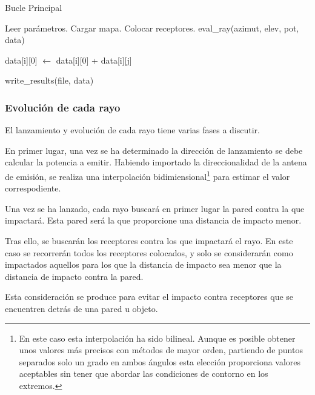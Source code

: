 \begin{algorithm}
    \caption{Bucle Principal}
    \label{alg:euclid}
    \begin{algorithmic}[1]
        \State Leer parámetros.
        \State Cargar mapa.
        \State Colocar receptores.
        \For{azimut $\in [0, 360)$}
                \State eval\_ray(azimut, elev, pot, data)
            \EndFor
        \EndFor

                \State data[i][0] $\gets$ data[i][0] + data[i][j]
            \EndFor
        \EndFor

        \State write\_results(file, data)
    \end{algorithmic}
\end{algorithm}

\subsubsection*{Evolución de cada rayo}

El lanzamiento y evolución de cada rayo tiene varias fases a discutir.

En primer lugar, una vez se ha determinado la dirección de lanzamiento se debe calcular la potencia a emitir.
Habiendo importado la direccionalidad de la antena de emisión, se realiza una interpolación bidimiensional\footnote{En este caso esta interpolación ha sido bilineal. Aunque es posible obtener unos valores más precisos con métodos de mayor orden, partiendo de puntos separados solo un grado en ambos ángulos esta elección proporciona valores aceptables sin tener que abordar las condiciones de contorno en los extremos.} para estimar el valor correspodiente.

Una vez se ha lanzado, cada rayo buscará en primer lugar la pared contra la que impactará.
Esta pared será la que proporcione una distancia de impacto menor.

Tras ello, se buscarán los receptores contra los que impactará el rayo.
En este caso se recorrerán todos los receptores colocados, y solo se considerarán como impactados aquellos para los que la distancia de impacto sea menor que la distancia de impacto contra la pared.

Esta consideración se produce para evitar el impacto contra receptores que se encuentren detrás de una pared u objeto.

